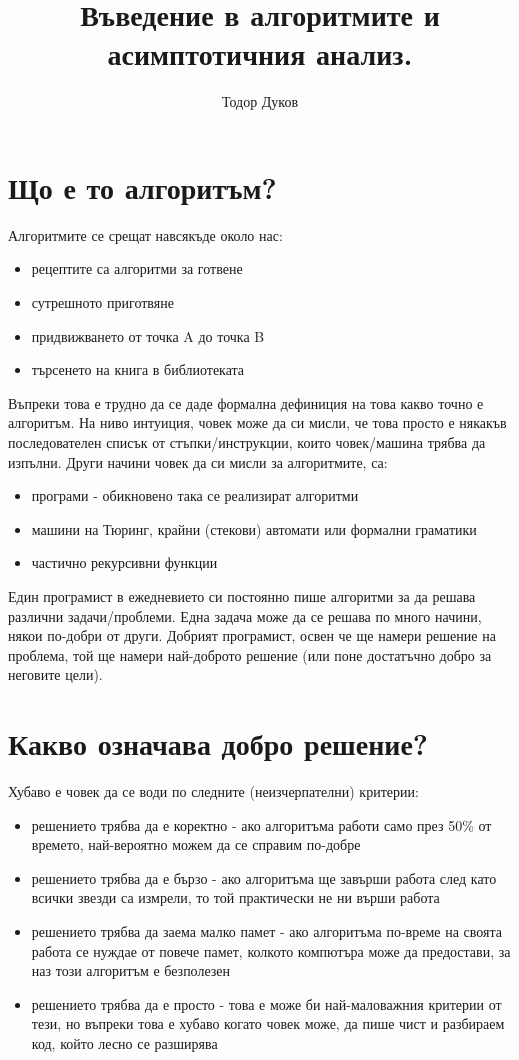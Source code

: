 \documentclass{article}
\title{Въведение в алгоритмите и асимптотичния анализ.}
\author{Тодор Дуков}
\date{}
\theoremstyle{definition}
\theoremstyle{plain}
\theoremstyle{remark}
\theoremstyle{definition}
\begin{document}
\maketitle

\section*{Що е то алгоритъм?}

Алгоритмите се срещат навсякъде около нас:
\begin{itemize}
  \item рецептите са алгоритми за готвене
  \item сутрешното приготвяне
  \item придвижването от точка A до точка B
  \item търсенето на книга в библиотеката
\end{itemize}

Въпреки това е трудно да се даде формална дефиниция на това какво точно е алгоритъм.
На ниво интуиция, човек може да си мисли, че това просто е някакъв последователен списък от стъпки/инструкции, които човек/машина трябва да изпълни.
Други начини човек да си мисли за алгоритмите, са:
\begin{itemize}
  \item програми - обикновено така се реализират алгоритми
  \item машини на Тюринг, крайни (стекови) автомати или формални граматики
  \item частично рекурсивни функции
\end{itemize}

Един програмист в ежедневието си постоянно пише алгоритми за да решава различни задачи/проблеми.
Една задача може да се решава по много начини, някои по-добри от други.
Добрият програмист, освен че ще намери решение на проблема, той ще намери най-доброто решение (или поне достатъчно добро за неговите цели).

\section*{Какво означава добро решение?}

Хубаво е човек да се води по следните (неизчерпателни) критерии:
\begin{itemize}
  \item решението трябва да е коректно - ако алгоритъма работи само през 50\% от времето, най-вероятно можем да се справим по-добре
  \item решението трябва да е бързо - ако алгоритъма ще завърши работа след като всички звезди са измрели, то той практически не ни върши работа
  \item решението трябва да заема малко памет - ако алгоритъма по-време на своята работа се нуждае от повече памет, колкото компютъра може да предостави, за наз този алгоритъм е безполезен
  \item решението трябва да е просто - това е може би най-маловажния критерии от тези, но въпреки това е хубаво когато човек може, да пише чист и разбираем код, който лесно се разширява
\end{itemize}
\end{document}
